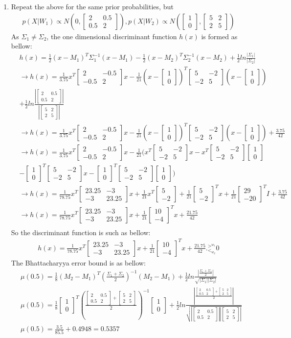 \documentclass[12pt]{article}
\newcommand{\gl}{^{>^{w_1}}_{<_{w_2}}}
\newcommand{\svector}[2]{\left[ \begin{matrix} #1 \\ #2 \end{matrix}\right]}
\newcommand{\smatrix}[4]{\left[ \begin{matrix} #1 & #2 \\ #3 & #4 \end{matrix}\right]}
\begin{document}
\begin{enumerate}
\item Repeat the above for the same prior probabilities, but
\begin{align*}
p(X|W_1) \propto N(0, \smatrix{2}{0.5}{0.5}{2}), p(X|W_2) \propto N(\svector{1}{0}, \smatrix{5}{2}{2}{5})
\end{align*}
As $\Sigma_1 \neq \Sigma_2$, the one dimensional discriminant function $h(x)$ is formed as bellow:
\begin{align*}
&h(x) = \frac{1}{2} (x - M_1)^T \Sigma_1^{-1} (x - M_1) - \frac{1}{2} (x - M_2)^T \Sigma_2^{-1} (x - M_2) + \frac{1}{2} ln \frac{|\Sigma_1|}{|\Sigma_2|} \\
&\rightarrow h(x) = \frac{1}{3.75}x^T \smatrix{2}{-0.5}{-0.5}{2} x - \frac{1}{21}(x - \svector{1}{0})^T \smatrix{5}{-2}{-2}{5} (x - \svector{1}{0}) \\
&+ \frac{1}{2} ln \frac{|\smatrix{2}{0.5}{0.5}{2}|}{|\smatrix{5}{2}{2}{5}|} \\
&\rightarrow h(x) = \frac{1}{3.75}x^T \smatrix{2}{-0.5}{-0.5}{2} x - \frac{1}{21}(x - \svector{1}{0})^T \smatrix{5}{-2}{-2}{5} (x - \svector{1}{0}) + \frac{3.75}{42} \\
&\rightarrow h(x) = \frac{1}{3.75}x^T \smatrix{2}{-0.5}{-0.5}{2} x  - \frac{1}{21}(x^T\smatrix{5}{-2}{-2}{5}x -x^T\smatrix{5}{-2}{-2}{5}\svector{1}{0} \\
&- \svector{1}{0}^T\smatrix{5}{-2}{-2}{5}x - \svector{1}{0}^T\smatrix{5}{-2}{-2}{5}\svector{1}{0})\\
&\rightarrow h(x) = \frac{1}{78.75}x^T\smatrix{23.25}{-3}{-3}{23.25}x + \frac{1}{21}x^T\svector{5}{-2} + \frac{1}{21}\svector{5}{-2}^T x + \frac{1}{21}\svector{29}{-20}^TI + \frac{3.75}{42}\\
&\rightarrow h(x) = \frac{1}{78.75}x^T\smatrix{23.25}{-3}{-3}{23.25}x  + \frac{1}{21} \svector{10}{-4}^T x + \frac{21.75}{42}\\
\end{align*}
So the discriminant function is such as bellow:
\begin{align*}
 h(x) = \frac{1}{78.75}x^T\smatrix{23.25}{-3}{-3}{23.25}x  + \frac{1}{21} \svector{10}{-4}^T x + \frac{21.75}{42} .\gl 0
\end{align*}
The Bhattacharyya error bound is as bellow:
\begin{align*}
&\mu(0.5) = \frac{1}{8} (M_2 - M_1)^T (\frac{\Sigma_1 + \Sigma_2}{2})^{-1} (M_2 - M_1) + \frac{1}{2} ln \frac{|\frac{\Sigma_1 + \Sigma_2}{2}|}{\sqrt{|\Sigma_1||\Sigma_2|}} \\
&\mu(0.5) = \frac{1}{8} \svector{1}{0}^T (\frac{\smatrix{2}{0.5}{0.5}{2} + \smatrix{5}{2}{2}{5}}{2})^{-1} \svector{1}{0} + \frac{1}{2} ln \frac{|\frac{\smatrix{2}{0.5}{0.5}{2} + \smatrix{5}{2}{2}{5}}{2}|}{\sqrt{|\smatrix{2}{0.5}{0.5}{2}||\smatrix{5}{2}{2}{5}|}} \\
&\mu(0.5) = \frac{3.5}{85.5} + 0.4948 = 0.5357
\end{align*} 






\end{enumerate}
\end{document}
